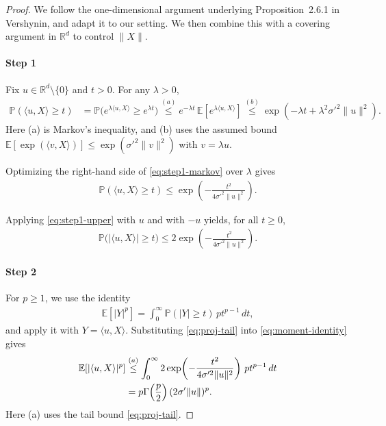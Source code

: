 \documentclass[10pt]{article}
\begin{document}
\begin{proof}
We follow the one-dimensional argument underlying Proposition~2.6.1 in Vershynin,
and adapt it to our setting. We then combine this with a covering argument
in $\mathbb{R}^d$ to control $\|X\|$.

\paragraph{Step 1}
Fix $u\in\mathbb{R}^d\setminus\{0\}$ and $t>0$. For any $\lambda>0$,
\begin{align}
\mathbb{P}(\langle u,X\rangle \ge t)
&= \mathbb{P}\big(e^{\lambda\langle u,X\rangle}\ge e^{\lambda t}\big)
\overset{(a)}{\le}
e^{-\lambda t}\,\mathbb{E}\!\left[e^{\lambda\langle u,X\rangle}\right]
\overset{(b)}{\le}
\exp\!\left(-\lambda t+\lambda^2\sigma'^2\|u\|^2\right).
\label{eq:step1-markov}
\end{align}
Here (a) is Markov's inequality, and (b) uses the assumed bound
$\mathbb{E}[\exp(\langle v,X\rangle)]\le \exp(\sigma'^2\|v\|^2)$ with $v=\lambda u$.

Optimizing the right-hand side of \eqref{eq:step1-markov} over $\lambda$ gives
\begin{align}
\mathbb{P}(\langle u,X\rangle \ge t)
\le
\exp\!\left(-\frac{t^2}{4\sigma'^2\|u\|^2}\right).
\label{eq:step1-upper}
\end{align}

Applying \eqref{eq:step1-upper} with $u$ and with $-u$ yields, for all $t\ge 0$,
\begin{align}
\mathbb{P}\big(|\langle u,X\rangle|\ge t\big)
\le
2\exp\!\left(-\frac{t^2}{4\sigma'^2\|u\|^2}\right).
\label{eq:proj-tail}
\end{align}


\paragraph{Step 2}
For $p\ge 1$, we use the identity
\begin{align}
\mathbb{E}[|Y|^p]
=
\int_0^\infty \mathbb{P}(|Y|\ge t)\,p t^{p-1}\,dt ,
\label{eq:moment-identity}
\end{align}
and apply it with $Y=\langle u,X\rangle$. Substituting \eqref{eq:proj-tail} into
\eqref{eq:moment-identity} gives
\begin{align}
\mathbb{E}[|\langle u,X\rangle|^p]
&\overset{(a)}{\le}
\int_0^\infty
2\exp\!\left(-\frac{t^2}{4\sigma'^2\|u\|^2}\right)\,p t^{p-1}\,dt
\notag\\
&=
p\Gamma\!\left(\frac{p}{2}\right)(2\sigma'\|u\|)^p.
\label{eq:step2-gamma}
\end{align}
Here (a) uses the tail bound \eqref{eq:proj-tail}.


\end{proof}
\end{document}
